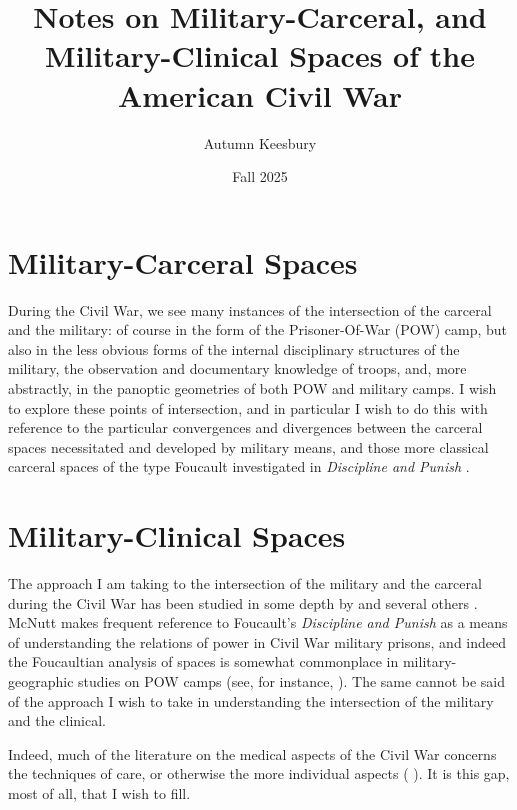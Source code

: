 \documentclass{article}
\title{Notes on Military-Carceral, and Military-Clinical Spaces of the American Civil War}
\author{Autumn Keesbury}
\date{Fall 2025}
\begin{document}
  \maketitle
  \thispagestyle{empty}
  \newpage
  \pagestyle{fancy}

  \section*{Military-Carceral Spaces}
  During the Civil War, we see many instances of the intersection of the carceral and the military: of course in the form of the Prisoner-Of-War (POW) camp,
  but also in the less obvious forms of the internal disciplinary structures of the military, the observation and documentary knowledge of troops, and, more
  abstractly, in the panoptic geometries of both POW and military camps. I wish to explore these points of intersection, and in particular I wish to do this
  with reference to the particular convergences and divergences between the carceral spaces necessitated and developed by military means, and those more
  classical carceral spaces of the type Foucault investigated in \textit{Discipline and Punish} \autocite{Foucault1995}.

  \section*{Military-Clinical Spaces}
  The approach I am taking to the intersection of the military and the carceral during the Civil War has been studied in some depth by \citeauthor{McNutt2024}
  and several others \autocites{McNutt2024}{McNutt2021}{McNutt2019}{McNutt2019a}. McNutt makes frequent reference to Foucault's \textit{Discipline and Punish} as a 
  means of understanding the relations of power in Civil War military prisons, and indeed the Foucaultian analysis of spaces is somewhat commonplace in military-geographic studies on POW camps (see, for instance, \citeauthor{Moran2022}). The same cannot be said of the approach I wish to take in understanding the
  intersection of the military and the clinical.

  Indeed, much of the literature on the medical aspects of the Civil War concerns the techniques of care, or otherwise the more individual aspects 
  (\citeauthor{Devine2016} ). It is this gap, most of all, that I wish to fill.  

  \newpage
  \nocite{*}
  \printbibliography
\end{document}
